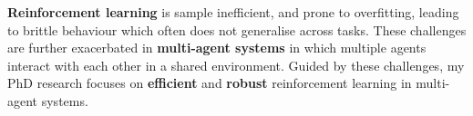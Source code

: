 \documentclass[]{lukas-cv-openfont}
\begin{document}
\noindent
\vspace{-1em}
\begin{flushleft}
    \textbf{Reinforcement learning} is sample inefficient, and prone to overfitting, leading to brittle behaviour which often does not generalise across tasks. These challenges are further exacerbated in \textbf{multi-agent systems} in which multiple agents interact with each other in a shared environment. Guided by these challenges, my PhD research focuses on \textbf{efficient} and \textbf{robust} reinforcement learning in multi-agent systems.




\end{flushleft}
\largesectionsep
\end{document}
